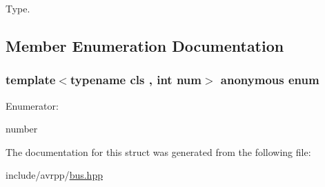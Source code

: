 Type. 



\subsection{Member Enumeration Documentation}
\hypertarget{structavrpp_1_1bus_1_1type__and__number_a3ae933d366a29b8d5265d94d3c3cc852}{
\subsubsection[{"@8}]{\setlength{\rightskip}{0pt plus 5cm}template$<$typename cls , int num$>$ anonymous enum}}
\label{structavrpp_1_1bus_1_1type__and__number_a3ae933d366a29b8d5265d94d3c3cc852}
\begin{Desc}
\item[Enumerator: ]\par
\begin{description}
\item[{\em 
\hypertarget{structavrpp_1_1bus_1_1type__and__number_a3ae933d366a29b8d5265d94d3c3cc852a13d5409b30e6924949f78a6c3a66b708}{
number}
\label{structavrpp_1_1bus_1_1type__and__number_a3ae933d366a29b8d5265d94d3c3cc852a13d5409b30e6924949f78a6c3a66b708}
}]number \end{description}
\end{Desc}



The documentation for this struct was generated from the following file:\begin{DoxyCompactItemize}
\item 
include/avrpp/\hyperlink{bus_8hpp}{bus.hpp}\end{DoxyCompactItemize}
